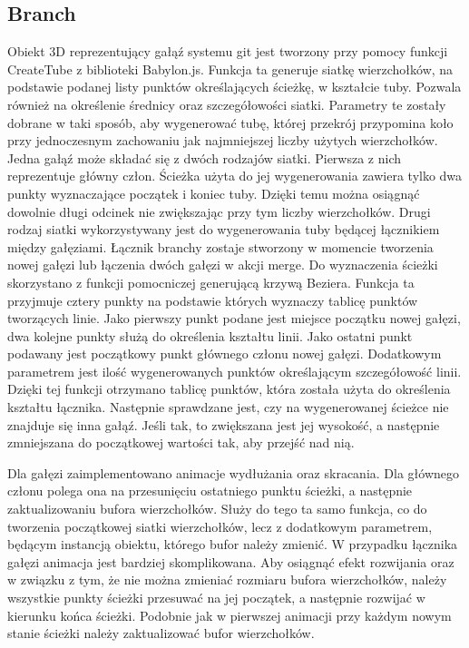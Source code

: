 \documentclass[12pt,a4paper,polish,thesis]{dcsbook}
\begin{document}
{	\subsection{Branch}
	Obiekt 3D reprezentujący gałąź systemu git jest tworzony przy pomocy funkcji CreateTube z biblioteki Babylon.js. Funkcja ta generuje siatkę wierzchołków, na podstawie podanej listy punktów określających ścieżkę, w kształcie tuby. Pozwala również na określenie średnicy oraz szczegółowości siatki. Parametry te zostały dobrane w taki sposób, aby wygenerować tubę, której przekrój przypomina koło przy jednoczesnym zachowaniu jak najmniejszej liczby użytych wierzchołków. Jedna gałąź może składać się z dwóch rodzajów siatki. Pierwsza z nich reprezentuje główny człon. Ścieżka użyta do jej wygenerowania zawiera tylko dwa punkty wyznaczające początek i koniec tuby. Dzięki temu można osiągnąć dowolnie długi odcinek nie zwiększając przy tym liczby wierzchołków. Drugi rodzaj siatki wykorzystywany jest do wygenerowania tuby będącej łącznikiem między gałęziami. Łącznik branchy zostaje stworzony w momencie tworzenia nowej gałęzi lub łączenia dwóch gałęzi w akcji merge. Do wyznaczenia ścieżki skorzystano z funkcji pomocniczej generującą krzywą Beziera. Funkcja ta przyjmuje cztery punkty na podstawie których wyznaczy tablicę punktów tworzących linie. Jako pierwszy punkt podane jest miejsce początku nowej gałęzi, dwa kolejne punkty służą do określenia kształtu linii. Jako ostatni punkt podawany jest początkowy punkt głównego członu nowej gałęzi. Dodatkowym parametrem jest ilość wygenerowanych punktów określającym szczegółowość linii. Dzięki tej funkcji otrzymano tablicę punktów, która została użyta do określenia kształtu łącznika. Następnie sprawdzane jest, czy na wygenerowanej ścieżce nie znajduje się inna gałąź. Jeśli tak, to zwiększana jest jej wysokość, a następnie zmniejszana do początkowej wartości tak, aby przejść nad nią.

	Dla gałęzi zaimplementowano animacje wydłużania oraz skracania. Dla głównego członu polega ona na przesunięciu ostatniego punktu ścieżki, a następnie zaktualizowaniu bufora wierzchołków. Służy do tego ta samo funkcja, co do tworzenia początkowej siatki wierzchołków, lecz z dodatkowym parametrem, będącym instancją obiektu, którego bufor należy zmienić. W przypadku łącznika gałęzi animacja jest bardziej skomplikowana. Aby osiągnąć efekt rozwijania oraz w związku z tym, że nie można zmieniać rozmiaru bufora wierzchołków, należy wszystkie punkty ścieżki przesuwać na jej początek, a następnie rozwijać w kierunku końca ścieżki. Podobnie jak w pierwszej animacji przy każdym nowym stanie ścieżki należy zaktualizować bufor wierzchołków.

}
\end{document}
